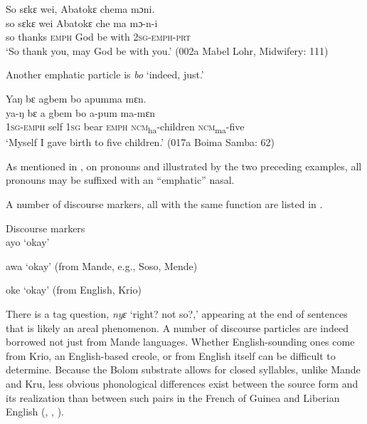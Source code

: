     \ex  So sɛkɛ wei, Abatokɛ chema mɔni.\\
      \gll so    sɛkɛ    wei    Abatokɛ    che  ma  mɔ-n-i\\
      so    thanks  \textsc{emph}    God      be    with  \textsc{2sg-emph-prt}\\
      \glt ‘So thank you, may God be with you.' (002a Mabel Lohr, Midwifery: 111)
\z
\z

Another emphatic particle is \textit{bo} ‘indeed, just.'

\ea%
    \label{ex:244}
    Yaŋ bɛ agbem bo apumma mɛn.\\
      \gll ya-ŋ      bɛ    a    gbem    bo      a-pum        ma-mɛn\\
      \textsc{1sg-emph}  self  \textsc{1sg}  bear    \textsc{emph}    \textsc{ncm}\textsubscript{ha}{}-children  \textsc{ncm}\textsubscript{ma}{}-five\\
      \glt ‘Myself I gave birth to five children.' (017a Boima Samba: 62)
\z

As mentioned in , on pronouns and illustrated by the two preceding examples, all pronouns may be suffixed with an “emphatic” nasal.

A number of discourse markers, all with the same function are listed in .

\TabPositions{1cm,4cm,6cm,8cm}

\ea%
    \label{ex:245}
    Discourse markers\\

ayo  \tab  ‘okay'

awa  \tab  ‘okay' (from Mande, e.g., Soso, Mende)

oke  \tab  ‘okay' (from English, Krio)
\z

There is a tag question, \textit{nyɛ} ‘right? not so?,' appearing at the end of sentences that is likely an areal phenomenon. A number of discourse particles are indeed borrowed not just from Mande languages. Whether English-sounding ones come from Krio, an English-based creole, or from English itself can be difficult to determine. Because the Bolom substrate allows for closed syllables, unlike Mande and Kru, less obvious phonological differences exist between the source form and its realization than between such pairs in the French of Guinea and Liberian English (\citealt{Childs1999}, \citealt{Childs2002b}, \citealt{Singler1988a}).

